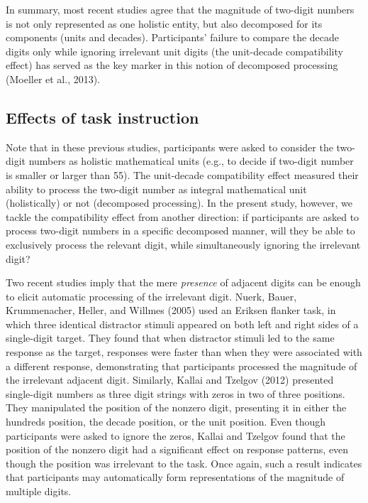 \documentclass[english,man]{apa6}
\theoremstyle{definition}
\theoremstyle{definition}
\theoremstyle{definition}
\theoremstyle{remark}
\begin{document}
In summary, most recent studies agree that the magnitude of two-digit
numbers is not only represented as one holistic entity, but also
decomposed for its components (units and decades). Participants' failure
to compare the decade digits only while ignoring irrelevant unit digits
(the unit-decade compatibility effect) has served as the key marker in
this notion of decomposed processing (Moeller et al., 2013).

\subsection{Effects of task
instruction}\label{effects-of-task-instruction}

Note that in these previous studies, participants were asked to consider
the two-digit numbers as holistic mathematical units (e.g., to decide if
two-digit number is smaller or larger than 55). The unit-decade
compatibility effect measured their ability to process the two-digit
number as integral mathematical unit (holistically) or not (decomposed
processing). In the present study, however, we tackle the compatibility
effect from another direction: if participants are asked to process
two-digit numbers in a specific decomposed manner, will they be able to
exclusively process the relevant digit, while simultaneously ignoring
the irrelevant digit?

Two recent studies imply that the mere \emph{presence} of adjacent
digits can be enough to elicit automatic processing of the irrelevant
digit. Nuerk, Bauer, Krummenacher, Heller, and Willmes (2005) used an
Eriksen flanker task, in which three identical distractor stimuli
appeared on both left and right sides of a single-digit target. They
found that when distractor stimuli led to the same response as the
target, responses were faster than when they were associated with a
different response, demonstrating that participants processed the
magnitude of the irrelevant adjacent digit. Similarly, Kallai and
Tzelgov (2012) presented single-digit numbers as three digit strings
with zeros in two of three positions. They manipulated the position of
the nonzero digit, presenting it in either the hundreds position, the
decade position, or the unit position. Even though participants were
asked to ignore the zeros, Kallai and Tzelgov found that the position of
the nonzero digit had a significant effect on response patterns, even
though the position was irrelevant to the task. Once again, such a
result indicates that participants may automatically form
representations of the magnitude of multiple digits.
\end{document}
